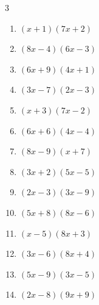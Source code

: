 \begin{multicols}{3}
\begin{enumerate}

  \item $(x+1)(7x+2)$


  \item $(8x-4)(6x-3)$


  \item $(6x+9)(4x+1)$


  \item $(3x-7)(2x-3)$


  \item $(x+3)(7x-2)$


  \item $(6x+6)(4x-4)$


\columnbreak %

  \item $(8x-9)(x+7)$


  \item $(3x+2)(5x-5)$


  \item $(2x-3)(3x-9)$


  \item $(5x+8)(8x-6)$


  \item $(x-5)(8x+3)$


  \item $(3x-6)(8x+4)$


  \item $(5x-9)(3x-5)$


  \item $(2x-8)(9x+9)$



\end{enumerate}
\end{multicols}
